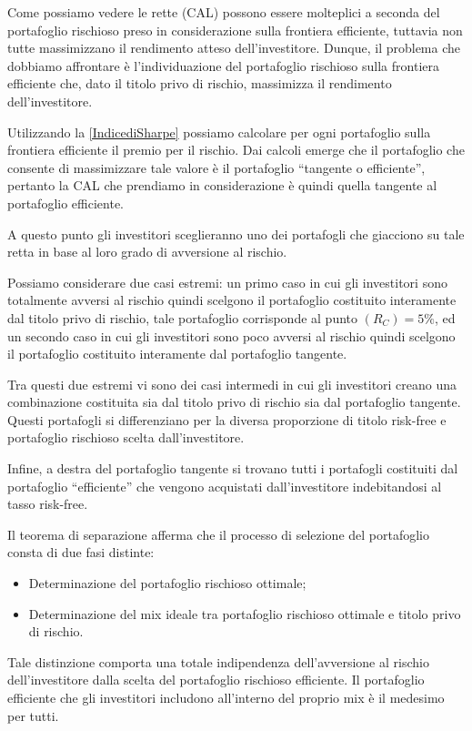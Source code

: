 Come possiamo vedere le rette (CAL) possono essere molteplici a seconda del portafoglio rischioso preso in considerazione sulla frontiera efficiente, tuttavia non tutte massimizzano il rendimento atteso dell'investitore. Dunque, il problema che dobbiamo affrontare è l'individuazione del portafoglio rischioso sulla frontiera efficiente che, dato il titolo privo di rischio,  massimizza il rendimento dell'investitore.

Utilizzando la \ref{IndicediSharpe} possiamo calcolare per ogni portafoglio sulla frontiera efficiente il premio per il rischio. Dai calcoli emerge che il portafoglio che consente di massimizzare tale valore è il portafoglio “tangente o efficiente”, pertanto la CAL che prendiamo in considerazione è quindi quella tangente al portafoglio efficiente. 

A questo punto gli investitori sceglieranno uno dei portafogli che giacciono su tale retta in base al loro grado di avversione al rischio. 

Possiamo considerare due casi estremi: un primo caso in cui gli investitori sono totalmente avversi al rischio quindi scelgono il portafoglio costituito interamente dal titolo privo di rischio, tale portafoglio corrisponde al punto $(R_{C})=5\%$, ed un secondo caso in cui gli investitori sono poco avversi al rischio quindi scelgono il portafoglio costituito interamente dal portafoglio tangente. 


Tra questi due estremi vi sono dei casi intermedi in cui gli investitori creano una combinazione costituita sia dal titolo privo di rischio sia dal portafoglio tangente. Questi portafogli si differenziano per la diversa proporzione di titolo risk-free e portafoglio rischioso scelta dall'investitore. 

Infine, a destra del portafoglio tangente si trovano tutti i portafogli costituiti dal portafoglio “efficiente” che vengono acquistati dall'investitore indebitandosi al tasso risk-free. 

Il teorema di separazione afferma che il processo di selezione del portafoglio consta di due fasi distinte: 
\begin{itemize}
	\item Determinazione del portafoglio rischioso ottimale;
	\item Determinazione del mix ideale tra portafoglio rischioso ottimale e titolo privo di rischio.
\end{itemize}
Tale distinzione comporta una totale indipendenza dell'avversione al rischio dell'investitore dalla scelta del portafoglio rischioso efficiente. Il portafoglio efficiente che gli investitori includono all'interno del proprio mix è il medesimo per tutti. 

